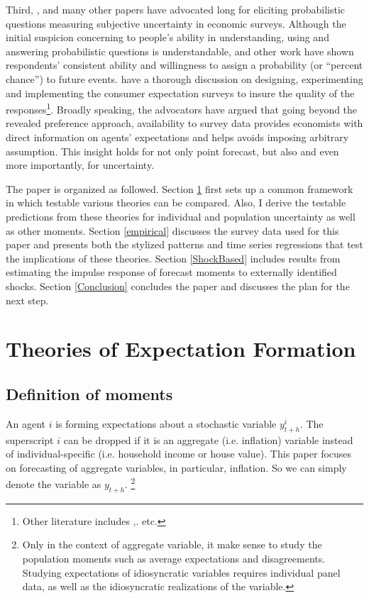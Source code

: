 \documentclass[12pt]{article}
\begin{document}
	Third, \citet{manski2004measuring},\citet{delavande2011measuring} and many other papers have advocated long for eliciting probabilistic questions measuring subjective uncertainty in economic surveys. Although the initial suspicion concerning to people's ability in understanding, using and answering probabilistic questions is understandable, \citet{bertrand2001people} and other work have shown respondents’ consistent ability and willingness to assign a probability (or “percent chance”) to future events. \citet{armantier2017overview} have a thorough discussion on designing, experimenting and implementing the consumer expectation surveys to insure the quality of the responses\footnote{Other literature includes \citet{van2008rethinking},\citet{delavande2014probabilistic}. etc.}. Broadly speaking, the advocators have argued that going beyond the revealed preference approach, availability to survey data provides economists with direct information on agents' expectations and helps avoids imposing arbitrary assumption.  This insight holds for not only point forecast, but also and even more importantly, for uncertainty.
	
	The paper is organized as followed. Section \ref{theory} first sets up a common framework in which testable various theories can be compared. Also, I derive the testable predictions from these theories for individual and population uncertainty as well as other moments. Section \ref{empirical} discusses the survey data used for this paper and presents both the stylized patterns and time series regressions that test the implications of these theories.   Section \ref{ShockBased} includes results from estimating the impulse response of forecast moments to externally identified shocks.  Section \ref{Conclusion} concludes the paper and discusses the plan for the next step. 
	
	\section{Theories of Expectation Formation}\label{theory}
	
	\subsection{Definition of moments}
	
	An agent $i$ is forming expectations about a stochastic variable $y^i_{t+h}$. The superscript $i$ can be dropped if it is an aggregate (i.e. inflation) variable instead of individual-specific  (i.e. household income or house value). This paper focuses on forecasting of aggregate variables, in particular, inflation. So we can simply denote the variable as $y_{t+h}$.  \footnote{Only in the context of aggregate variable, it make sense to study the population moments such as average expectations and disagreements. Studying expectations of idiosyncratic variables requires individual panel data, as well as the idiosyncratic realizations of the variable. }
	
\end{document}
